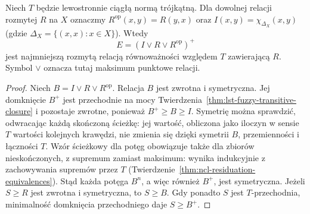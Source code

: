 \begin{twierdzenie}
\label{thm:ncl-equivalence-closure}
Niech $T$ będzie lewostronnie ciągłą normą trójkątną.
Dla dowolnej relacji rozmytej $R$ na $X$ oznaczmy
$R^{\mathrm{op}}(x,y)=R(y,x)$ oraz
$I(x,y)=\chi_{\Delta_X}(x,y)$ (gdzie $\Delta_X=\{(x,x):x\in X\}$). Wtedy
\[
 E=(I\vee R\vee R^{\mathrm{op}})^+
\]
jest najmniejszą rozmytą relacją równoważności względem
$T$ zawierającą $R$. Symbol $\vee$ oznacza tutaj
maksimum punktowe relacji.
\end{twierdzenie}
\begin{proof}
Niech $B=I\vee R\vee R^{\mathrm{op}}$. Relacja $B$
jest zwrotna i symetryczna. Jej domknięcie $B^+$
jest przechodnie na mocy
Twierdzenia~\ref{thm:lst-fuzzy-transitive-closure}
i pozostaje zwrotne, ponieważ $B^+\geq B\geq I$.
Symetrię można sprawdzić, odwracając każdą skończoną
ścieżkę: jej wartość, obliczona jako iloczyn w sensie
$T$ wartości kolejnych krawędzi, nie zmienia się
dzięki symetrii $B$, przemienności i łączności $T$.
Wzór ścieżkowy dla potęg obowiązuje także dla zbiorów
nieskończonych, z supremum zamiast maksimum:
wynika indukcyjnie z zachowywania supremów przez $T$
(Twierdzenie~\ref{thm:ncl-residuation-equivalences}).
Stąd każda potęga $B^n$, a więc również $B^+$,
jest symetryczna.
Jeżeli $S\geq R$ jest zwrotna i symetryczna, to
$S\geq B$. Gdy ponadto $S$ jest $T$-przechodnia,
minimalność domknięcia przechodniego daje $S\geq B^+$.
\end{proof}

